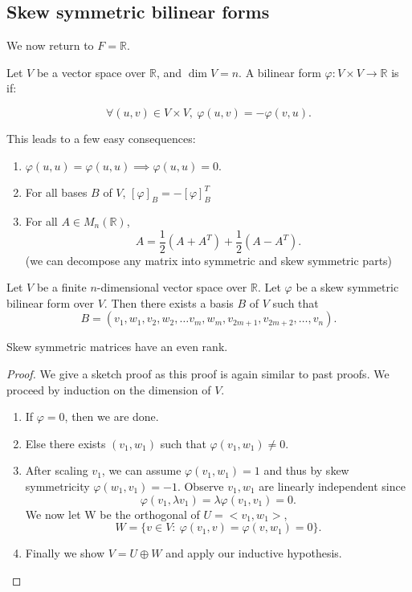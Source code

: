 \documentclass[a4paper]{scrartcl}
\begin{document}
\subsection{Skew symmetric bilinear forms}
We now return to $F=\mathbb{R}$.
\begin{definition}
      Let $V$ be a vector space over $\mathbb{R}$, and $\operatorname{dim}V=n$. A bilinear form $\varphi: V \times V \rightarrow \mathbb{R}$ is  if: 
      
      \[\forall \left(u,v\right) \in V \times V, \ \varphi \left(u,v\right)=-\varphi \left(v,u\right).\]
\end{definition}
\begin{remark} This leads to a few easy consequences:
      \begin{enumerate}
           \item $\varphi \left(u,u\right)=\varphi \left(u,u\right) \implies \varphi \left(u,u\right)=0$.
           \item For all bases $B$ of $V$, $[\varphi]_B=-[\varphi]_B^T$
           \item For all $A \in M_n \left(\mathbb{R}\right)$,
           \[A=\frac{1}{2}\left(A+A^T\right)+ \frac{1}{2}\left(A-A^T\right).\]
           (we can decompose any matrix into symmetric and skew symmetric parts)
      \end{enumerate}
\end{remark}
\begin{theorem}
      Let $V$ be a finite $n$-dimensional vector space over $\mathbb{R}$. Let $\varphi$ be a skew symmetric bilinear form over $V$. Then there exists a basis $B$ of $V$ such that 
      \[B=\left(v_1,w_1,v_2,w_2, \ldots v_m,w_m,v_{2m+1},v_{2m+2},\ldots ,v_n\right).\]
\end{theorem}
\begin{corollary}
     Skew symmetric matrices have an even rank.
\end{corollary}
\begin{proof}
      We give a sketch proof as this proof is again similar to past proofs. We proceed by induction on the dimension of $V$.
      \begin{enumerate}
           \item If $\varphi=0$, then we are done.
           \item Else there exists $\left(v_1,w_1\right)$ such that $\varphi \left(v_1,w_1\right)\neq 0$.
           \item After scaling $v_1$, we can assume $\varphi \left(v_1,w_1\right)=1$ and thus by skew symmetricity $\varphi \left(w_1,v_1\right)=-1$. Observe $v_1,w_1$ are linearly independent since 
           \[\varphi \left(v_1, \lambda v_1\right)=\lambda \varphi \left(v_1,v_1\right)=0.\]
           We now let W be the orthogonal of $U=<v_1,w_1>$, 
           \[ W=\{v \in V: \ \varphi \left(v_1,v\right)=\varphi \left(v,w_1\right)=0 \}. \]
           \item Finally we show $V=U \oplus W$ and apply our inductive hypothesis.
      \end{enumerate}
\end{proof}
\end{document}
